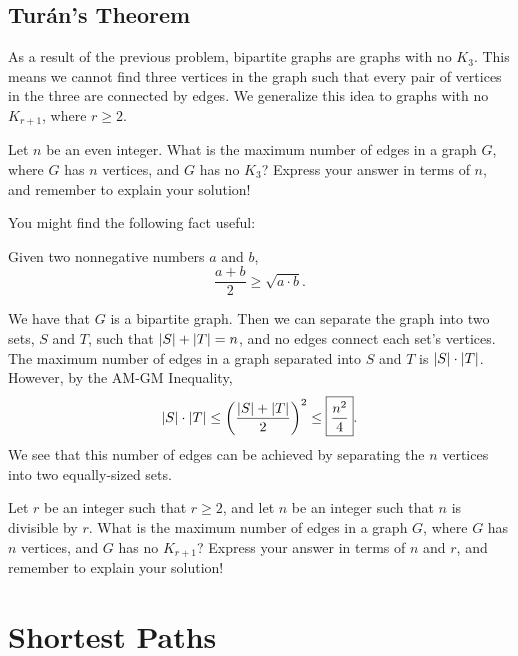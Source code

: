 \documentclass[11pt]{article}
\begin{document}
\subsection{Tur\'{a}n's Theorem}

As a result of the previous problem, bipartite graphs are graphs with no $K_3$. This means we cannot find three vertices in the graph such that
every pair of vertices in the three are connected by edges. We generalize this idea to graphs with no $K_{r+1}$, where $r \ge 2$.

\begin{problem} %
Let $n$ be an even integer. What is the maximum number of edges in a graph $G$, where $G$ has $n$ vertices, and $G$ has no $K_3$? Express your answer
in terms of $n$, and remember to explain your solution!

You might find the following fact useful:
\begin{theorem}[AM-GM]
\label{thm:am-gm}
Given two nonnegative numbers $a$ and $b$,
\[\frac{a + b}{2} \ge \sqrt{a \cdot b}.\]
\end{theorem}
\end{problem}

\begin{solution}
We have that $G$ is a bipartite graph. Then we can separate the graph into two sets, $S$ and $T$, such that $\left\lvert S \right\rvert + \left\lvert T \right\rvert = n$,
and no edges connect each set's vertices. The maximum number of edges in a graph separated into $S$ and $T$ is $\left\lvert S \right\rvert \cdot \left\lvert T \right\rvert$. However, by the
AM-GM Inequality,
\[\left\lvert S \right\rvert \cdot \left\lvert T \right\rvert \le \left(\frac{\left\lvert S \right\rvert + \left\lvert T \right\rvert}{2}\right)^2 \le \boxed{\frac{n^2}{4}}. \]
We see that this number of edges can be achieved by separating the $n$ vertices into two equally-sized sets.
\end{solution}

\begin{problem}[Tur\'{a}n] %
Let $r$ be an integer such that $r \ge 2$, and let $n$ be an integer such that $n$ is divisible by $r$.
What is the maximum number of edges in a graph $G$, where $G$ has $n$ vertices, and $G$ has no $K_{r+1}$? Express your answer
in terms of $n$ and $r$, and remember to explain your solution!
\end{problem}

\begin{solution}
\end{solution}

\section{Shortest Paths}
\end{document}
